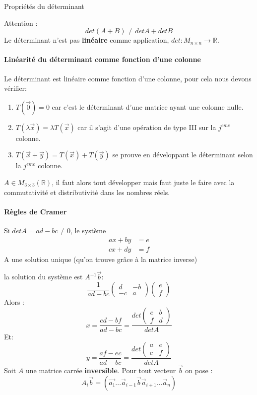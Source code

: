 \begin{parag}{Propriétés du déterminant}
\begin{framedremark}
    
        Attention : \[ det(A + B) \neq det A + det B\]
        Le déterminant n'est pas \textbf{linéaire} comme application, $det : M_{n\times n} \to \mathbb{R}$.
    
    \end{framedremark}
\end{parag}

    \paragraph{Linéarité du déterminant comme fonction \textbf{d'une colonne}}
    Le déterminant est linéaire comme fonction d'une colonne, pour cela nous devons vérifier:
    \begin{enumerate}
        \item $T(\vec{0}) = 0$ car c'est le déterminant d'une matrice ayant une colonne nulle.
        \item $T(\lambda\vec{x}) = \lambda T(\vec{x})$ car il s'agit d'une opération de type III sur la $j^{eme}$ colonne.
        \item $T(\vec{x}+ \vec{y}) = T(\vec{x}) + T(\vec{y})$ se prouve en développant le déterminant selon la $j^{eme}$ colonne.

    \end{enumerate}


    $A  \in M_{3\times3}(\mathbb{R})$, il faut alors tout développer mais faut juste le faire avec la commutativité et distributivité dans les nombres réels.

    \paragraph{Règles de Cramer}
    \begin{theoreme}
    Si $det A = ad-bc \neq 0$, le système
    \begin{align*}
        ax + by &= e\\
        cx + dy &= f
    \end{align*}
    A une solution unique (qu'on trouve grâce à la matrice inverse)
    \end{theoreme}
    
la solution du système est $A^{-1}\vec{b}$: 
\[\frac{1}{ad -bc}\begin{pmatrix}
    d & -b \\
    -c & a
\end{pmatrix}
\begin{pmatrix}
    e \\
    f
\end{pmatrix}\]
Alors : 
\[x = \frac{ed -bf}{ad -bc} =  \frac{det\begin{pmatrix}
    e & b \\
    f & d
\end{pmatrix}} {det A}\]
Et:
\[
y = \frac{af - ec}{ad - bc} = \frac{det \begin{pmatrix}
    a & e \\
    c & f
\end{pmatrix}}{det A}
\]
Soit $A$ une matrice carrée \textbf{inversible}. Pour tout vecteur $\vec{b}$ on pose :
\[A_i\vec{b} = (\vec{a_1}... \vec{a}_{i-1} \vec{b} \vec{a}_{i+ 1} ... \vec{a}_n)\]

